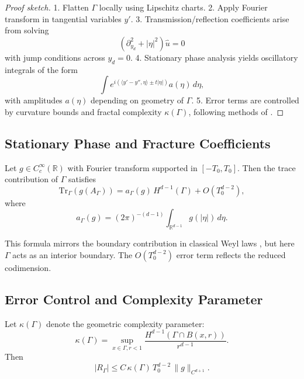 \begin{proof}[Proof sketch]
1. Flatten $\Gamma$ locally using Lipschitz charts.  
2. Apply Fourier transform in tangential variables $y'$.
3. Transmission/reflection coefficients arise from solving
\[
(\partial_{y_d}^2 + |\eta|^2) \widehat{u} = 0
\]
with jump conditions across $y_d=0$.  
4. Stationary phase analysis yields oscillatory integrals of the form
\[
\int e^{i(\langle y'-y'',\eta\rangle \pm t|\eta|)} a(\eta)\, d\eta,
\]
with amplitudes $a(\eta)$ depending on geometry of $\Gamma$.  
5. Error terms are controlled by curvature bounds and fractal complexity
$\kappa(\Gamma)$, following methods of \cite{MelroseTaylor1985}.
\end{proof}

\subsection*{Stationary Phase and Fracture Coefficients}
\begin{theorem}
\label{thm:fracture-coefficient}
Let $g \in C_c^\infty(\mathbb{R})$ with Fourier transform supported in
$[-T_0,T_0]$. Then the trace contribution of $\Gamma$ satisfies
\[
\mathrm{Tr}_\Gamma(g(A_\Gamma)) =
a_\Gamma(g) \, H^{d-1}(\Gamma) + O(T_0^{d-2}),
\]
where
\[
a_\Gamma(g) = (2\pi)^{-(d-1)} \int_{\mathbb{R}^{d-1}} g(|\eta|)\, d\eta.
\]
\end{theorem}

\begin{remark}
This formula mirrors the boundary contribution in classical Weyl laws
\cite{Ivrii1980}, but here $\Gamma$ acts as an interior boundary. The
$O(T_0^{d-2})$ error term reflects the reduced codimension.
\end{remark}

\subsection*{Error Control and Complexity Parameter}
\begin{proposition}
\label{prop:error-control}
Let $\kappa(\Gamma)$ denote the geometric complexity parameter:
\[
\kappa(\Gamma) = \sup_{x\in\Gamma, r<1}
\frac{H^{d-1}(\Gamma\cap B(x,r))}{r^{d-1}}.
\]
Then
\[
|R_\Gamma| \leq C \, \kappa(\Gamma)\, T_0^{d-2}\, \|g\|_{C^{d+1}}.
\]
\end{proposition}

